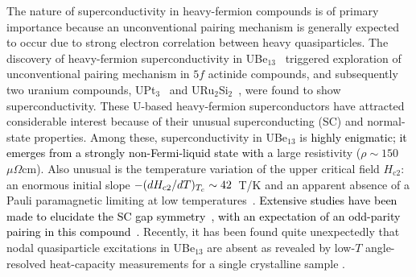 \documentclass[twocolumn, prl]{revtex4}%
\newcommand{\correct}[1]{\textcolor{black}{#1}}
\begin{document}
The nature of superconductivity in heavy-fermion compounds is of primary importance because  
 an unconventional pairing mechanism 
 is generally expected to occur due to strong electron correlation between heavy quasiparticles.
 The discovery of heavy-fermion superconductivity in UBe$_{13}$~\cite{Ott_PRL_1983}  triggered exploration of  
 unconventional pairing mechanism  in $5f$ actinide compounds, and subsequently two uranium compounds, UPt$_3$~\cite{Stewart_PRL_1984} and URu$_2$Si$_2$~\cite{URS1,URS2}, were found to show  superconductivity. 
 These U-based heavy-fermion superconductors have attracted considerable interest because of their unusual 
 superconducting (SC) and normal-state properties.  %
Among these, superconductivity in UBe$_{13}$ is \correct{highly enigmatic; it emerges from a strongly non-Fermi-liquid state with a} large resistivity ($\rho \sim 150$ $\mu \Omega$cm).
Also unusual is the temperature variation of the upper critical field $H_{\mathrm{c2}}$: an enormous initial slope $-(dH_{\rm c2}/dT)_{T_c}\sim 42$~T/K and an apparent absence of a Pauli paramagnetic limiting at low temperatures~\cite{Maple85}.
\correct{Extensive studies have been made to elucidate the SC gap symmetry~\cite{MacLaughlin_PRL_1984,Walti_PRBR_2001}, with an expectation of an odd-parity pairing in this compound~\cite{Ott_PRL_1984,Einzel86,Tien_PRB_1989,Fomin00}.}
Recently, it has been found quite unexpectedly that nodal   quasiparticle excitations in UBe$_{13}$ are absent
  as  revealed by  low-$T$ angle-resolved heat-capacity measurements for  a single crystalline sample
 \cite{YShimizu_PRL_2015}. 



 
\end{document}
